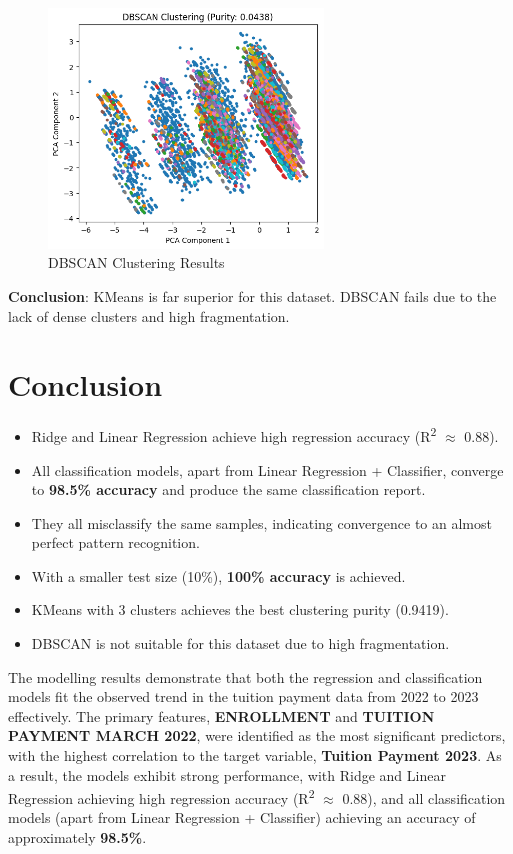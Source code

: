 \documentclass{article}
\begin{document}
\begin{figure}[H]
\centering
\includegraphics[width=0.65\textwidth]{DBScan.png}
\caption{DBSCAN Clustering Results}
\end{figure}

\textbf{Conclusion}: KMeans is far superior for this dataset. DBSCAN fails due to the lack of dense clusters and high fragmentation.

\section{Conclusion}
\begin{itemize}
    \item Ridge and Linear Regression achieve high regression accuracy (R\textsuperscript{2} $\approx$ 0.88).
    \item All classification models, apart from Linear Regression + Classifier, converge to \textbf{98.5\% accuracy} and produce the same classification report.
    \item They all misclassify the same samples, indicating convergence to an almost perfect pattern recognition.
    \item With a smaller test size (10\%), \textbf{100\% accuracy} is achieved.
    \item KMeans with 3 clusters achieves the best clustering purity (0.9419).
    \item DBSCAN is not suitable for this dataset due to high fragmentation.
\end{itemize}
The modelling results demonstrate that both the regression and classification models fit the observed trend in the tuition payment data from 2022 to 2023 effectively. The primary features, \textbf{ENROLLMENT} and \textbf{TUITION PAYMENT MARCH 2022}, were identified as the most significant predictors, with the highest correlation to the target variable, \textbf{Tuition Payment 2023}. As a result, the models exhibit strong performance, with Ridge and Linear Regression achieving high regression accuracy (R\textsuperscript{2} $\approx$ 0.88), and all classification models (apart from Linear Regression + Classifier) achieving an accuracy of approximately \textbf{98.5\%}.
\end{document}

